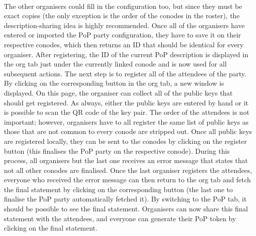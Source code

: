 \paragraph{}
The other organisers could fill in the configuration too, but since they must be exact copies (the only exception is the order of the conodes in the roster), the description-sharing idea is highly recommended. Once all of the organisers have entered or imported the PoP party configuration, they have to save it on their respective conodes, which then returns an ID that should be identical for every organiser. After registering, the ID of the current PoP description is displayed in the org tab just under the currently linked conode and is now used for all subsequent actions. The next step is to register all of the attendees of the party. By clicking on the corresponding button in the org tab, a new window is displayed. On this page, the organiser can collect all of the public keys that should get registered. As always, either the public keys are entered by hand or it is possible to scan the QR code of the key pair. The order of the attendees is not important; however, organisers have to all register the same list of public keys as those that are not common to every conode are stripped out. Once all public keys are registered locally, they can be sent to the conodes by clicking on the register button (this finalises the PoP party on the respective conode). During this process, all organisers but the last one receives an error message that states that not all other conodes are finalised. Once the last organiser registers the attendees, everyone who received the error message can then return to the org tab and fetch the final statement by clicking on the corresponding button (the last one to finalise the PoP party automatically fetched it). By switching to the PoP tab, it should be possible to see the final statement. Organisers can now share this final statement with the attendees, and everyone can generate their PoP token by clicking on the final statement.

